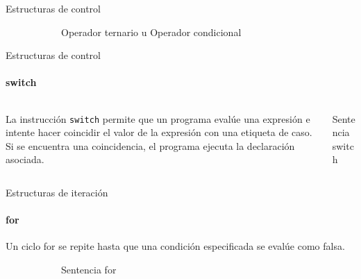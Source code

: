 \documentclass[aspectratio=169]{beamer}
\begin{document}
\begin{darkframes}
\begin{frame}{Estructuras de control}
      \begin{figure}[H]
        \begin{subfigure}{.7\textwidth}
          \begin{block}{Operador ternario u Operador condicional}
            \ternary
          \end{block}
        \end{subfigure}
      \end{figure}

    \end{frame}


    \begin{frame}{Estructuras de control}
      \framesubtitle{switch}

      \begin{columns}[T]
         \begin{column}{.5\textwidth}
            La instrucción \texttt{switch} permite que un programa evalúe una expresión e intente hacer coincidir el valor de la expresión con una etiqueta de caso. Si se encuentra una coincidencia, el programa ejecuta la declaración asociada.
         \end{column}
         \begin{column}{.5\textwidth}
         \begin{block}{Sentencia switch}
            \switch
         \end{block}
         \end{column}
       \end{columns}

    \end{frame}


    \begin{frame}{Estructuras de iteración}
      \framesubtitle{for}
      Un ciclo for se repite hasta que una condición especificada se evalúe como falsa.
      \begin{figure}[H]
        \begin{subfigure}{.9\textwidth}
          \begin{block}{Sentencia for}
            \for
          \end{block}
        \end{subfigure}
      \end{figure}
    \end{frame}


\end{darkframes}
\end{document}
